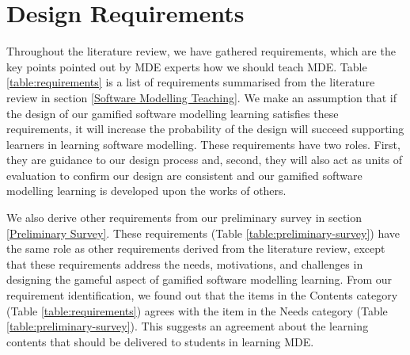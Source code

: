 \documentclass[12pt, a4paper]{report}
\begin{document}
\section{Design Requirements}
Throughout the literature review, we have gathered requirements, which are the key points pointed out by MDE experts how we should teach MDE. Table \ref{table:requirements} is a list of requirements summarised from the literature review in section \ref{Software Modelling Teaching}. We make an assumption that if the design of our gamified software modelling learning satisfies these requirements, it will increase the probability of the design will succeed supporting learners in learning software modelling. These requirements have two roles. First, they are guidance to our design process and, second, they will also act as units of evaluation to confirm our design are consistent and our gamified software modelling learning is developed upon the works of others.      
   
We also derive other requirements from our preliminary survey in section \ref{Preliminary Survey}. These requirements (Table \ref{table:preliminary-survey}) have the same role as other requirements derived from the literature review, except that these requirements   address the needs, motivations, and challenges in designing the gameful aspect of gamified software modelling learning. From our requirement identification, we found out that the items in the Contents category (Table \ref{table:requirements}) agrees with the item in the Needs category (Table \ref{table:preliminary-survey}). This suggests an agreement about the learning contents that should be delivered to students in learning MDE.
\end{document}
